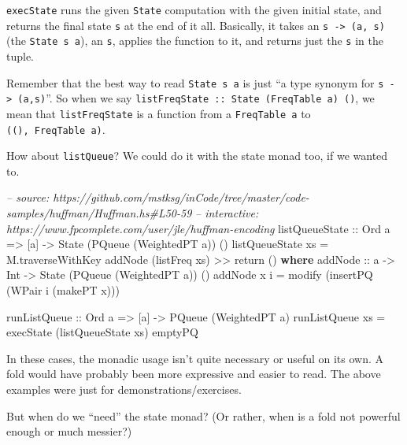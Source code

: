 \documentclass[]{article}
\newenvironment{Shaded}{}{}
\newcommand{\KeywordTok}[1]{\textcolor[rgb]{0.00,0.44,0.13}{\textbf{{#1}}}}
\newcommand{\DataTypeTok}[1]{\textcolor[rgb]{0.56,0.13,0.00}{{#1}}}
\newcommand{\CommentTok}[1]{\textcolor[rgb]{0.38,0.63,0.69}{\textit{{#1}}}}
\newcommand{\OtherTok}[1]{\textcolor[rgb]{0.00,0.44,0.13}{{#1}}}
\newcommand{\FunctionTok}[1]{\textcolor[rgb]{0.02,0.16,0.49}{{#1}}}
\newcommand{\NormalTok}[1]{{#1}}
\begin{document}
\texttt{execState} runs the given \texttt{State} computation with the given
initial state, and returns the final state \texttt{s} at the end of it all.
Basically, it takes an \texttt{s\ -\textgreater{}\ (a,\ s)} (the
\texttt{State\ s\ a}), an \texttt{s}, applies the function to it, and returns
just the \texttt{s} in the tuple.

Remember that the best way to read \texttt{State\ s\ a} is just ``a type synonym
for \texttt{s\ -\textgreater{}\ (a,s)}''. So when we say
\texttt{listFreqState\ ::\ State\ (FreqTable\ a)\ ()}, we mean that
\texttt{listFreqState} is a function from a \texttt{FreqTable\ a} to
\texttt{((),\ FreqTable\ a)}.

How about \texttt{listQueue}? We could do it with the state monad too, if we
wanted to.

\begin{Shaded}
\begin{Highlighting}[]
\CommentTok{-- source: https://github.com/mstksg/inCode/tree/master/code-samples/huffman/Huffman.hs#L50-59}
\CommentTok{-- interactive: https://www.fpcomplete.com/user/jle/huffman-encoding}
\OtherTok{listQueueState ::} \DataTypeTok{Ord} \NormalTok{a }\OtherTok{=>} \NormalTok{[a] }\OtherTok{->} \DataTypeTok{State} \NormalTok{(}\DataTypeTok{PQueue} \NormalTok{(}\DataTypeTok{WeightedPT} \NormalTok{a)) ()}
\NormalTok{listQueueState xs }\FunctionTok{=} \NormalTok{M.traverseWithKey addNode (listFreq xs) }\FunctionTok{>>} \NormalTok{return ()}
  \KeywordTok{where}
\OtherTok{    addNode ::} \NormalTok{a }\OtherTok{->} \DataTypeTok{Int} \OtherTok{->} \DataTypeTok{State} \NormalTok{(}\DataTypeTok{PQueue} \NormalTok{(}\DataTypeTok{WeightedPT} \NormalTok{a)) ()}
    \NormalTok{addNode x i }\FunctionTok{=} \NormalTok{modify (insertPQ (}\DataTypeTok{WPair} \NormalTok{i (makePT x)))}

\OtherTok{runListQueue ::} \DataTypeTok{Ord} \NormalTok{a }\OtherTok{=>} \NormalTok{[a] }\OtherTok{->} \DataTypeTok{PQueue} \NormalTok{(}\DataTypeTok{WeightedPT} \NormalTok{a)}
\NormalTok{runListQueue xs }\FunctionTok{=} \NormalTok{execState (listQueueState xs) emptyPQ}
\end{Highlighting}
\end{Shaded}

In these cases, the monadic usage isn't quite necessary or useful on its own. A
fold would have probably been more expressive and easier to read. The above
examples were just for demonstrations/exercises.

But when do we ``need'' the state monad? (Or rather, when is a fold not powerful
enough or much messier?)
\end{document}
